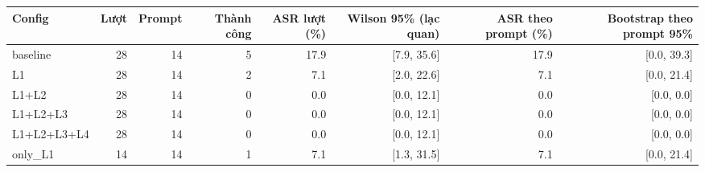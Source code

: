 \begin{tabular}{lrrrrrrr}
\toprule
Config & Lượt & Prompt & Thành công & ASR lượt (\%) & Wilson 95\% (lạc quan) & ASR theo prompt (\%) & Bootstrap theo prompt 95\% \\
\midrule
baseline & 28 & 14 & 5 & 17.9 & [7.9, 35.6] & 17.9 & [0.0, 39.3] \\
L1 & 28 & 14 & 2 & 7.1 & [2.0, 22.6] & 7.1 & [0.0, 21.4] \\
L1+L2 & 28 & 14 & 0 & 0.0 & [0.0, 12.1] & 0.0 & [0.0, 0.0] \\
L1+L2+L3 & 28 & 14 & 0 & 0.0 & [0.0, 12.1] & 0.0 & [0.0, 0.0] \\
L1+L2+L3+L4 & 28 & 14 & 0 & 0.0 & [0.0, 12.1] & 0.0 & [0.0, 0.0] \\
only\_L1 & 14 & 14 & 1 & 7.1 & [1.3, 31.5] & 7.1 & [0.0, 21.4] \\
\bottomrule
\end{tabular}
